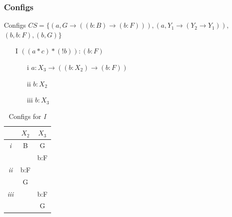 \documentclass{beamer}
\begin{document}
\subsubsection{Configs}
\begin{frame}{Configs}
	$CS = \{(a, G \to ((b:B) \to (b:F))), (a, Y_1 \to (Y_2 \to Y_1)),$ $(b, b:F), (b, G)\}$\\	
	\begin{table}
	\parbox{.6\linewidth}{
	\centering
	\begin{enumerate}
	\item[I]$((a*c)*(!b)):(b:F)$
			\begin{itemize}
			\item[i] $a:X_3 \to ((b:X_2) \rightarrow (b:F))$
			\item[ii] $b:X_2$
			\item[iii] $b:X_3$
			\end{itemize}
	\end{enumerate}
	}
	\hfill
	\parbox{.35\linewidth}{
	\centering
		\begin{tabular}{c c c}
		 & $X_2$ & $X_3$ \\
	 	\hline
	 	\emph{i}   & B & G \\
	 	  &  & b:F\footnotemark\\
	 	\hline	  
	 	\emph{ii}  & b:F &\\
	 	&G&\\
	 	\hline
	 	\emph{iii}  & &b:F\\
	 	&&G\\
	 	\hline 
		\end{tabular}
	\caption{Configs for \emph{I}}
	}
	\end{table}
\end{frame}
\end{document}
